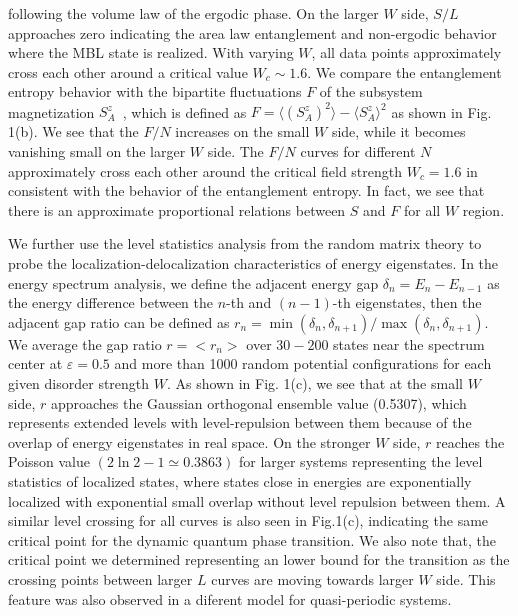 \documentclass[prl,aps,epsf,showpacs,twocolumn]{revtex4}
\begin{document}
following the volume law of the ergodic phase.    On the  larger $W$ side,
$S/L$ approaches zero indicating the area law  entanglement and non-ergodic
behavior  where the MBL state is realized.  With varying $W$,  all data points
approximately cross each other around  a critical value  $W_c \sim 1.6$.  We
compare the entanglement entropy behavior with the  bipartite fluctuations $F$
of the subsystem magnetization $S^z_A$~\cite{luitz2015,song2012}, which is
defined as $F=\langle \left( S^z_A \right)^2 \rangle - \langle S^z_A \rangle^2$
as shown  in Fig. 1(b).  We see that the $F/N$ increases on the  small  $W$
side, while it becomes vanishing small on the larger $W$ side.  The $F/N$ curves
for different $N$ approximately cross each other around the critical field
strength $W_c=1.6$ in consistent with the behavior of the entanglement entropy.
In fact, we see that there is an approximate proportional relations between $S$
and $F$  for all $W$  region. 




We further use the  level statistics analysis from the random matrix
theory\cite{atas2013,oganesyan2007} to probe the localization-delocalization
characteristics of  energy  eigenstates.
In the energy spectrum analysis\cite{luitz2015}, we define the adjacent  energy
gap $\delta_n=E_n-E_{n-1}$ as the energy difference between the $n$-th and
$(n-1)$-th eigenstates, then the adjacent gap ratio can be defined as
$r_n=\min(\delta_n, \delta_{n+1})/\max(\delta_n, \delta_{n+1})$.  We  average the
gap ratio $r=<r_n>$  over $30-200$  states near the spectrum center at
$\varepsilon=0.5$   and more than 1000 random  potential configurations for each
given disorder  strength $W$.   As shown in Fig. 1(c),   we see that at the
small $W$ side, $r$ approaches  the Gaussian  orthogonal ensemble  value
(0.5307),  which represents extended levels with level-repulsion  between them
because of the overlap of  energy eigenstates in real space.  On the stronger
$W$ side,  $r$ reaches the Poisson value $(2\ln2-1\simeq 0.3863)$ for larger
systems representing the level statistics of   localized states, where  states
close in energies are  exponentially localized with exponential small overlap
without level repulsion between them\cite{mehta1991}.  A similar level crossing
for all curves is also seen in Fig.1(c),  indicating the same critical point for
the dynamic quantum phase transition.  We also note that,   the critical point
we determined representing an lower  bound for the transition as the crossing
points between larger $L$ curves are moving towards larger $W$ side.    This
feature was also observed in a diferent model for quasi-periodic
systems\cite{vedika2016}.
\end{document}
